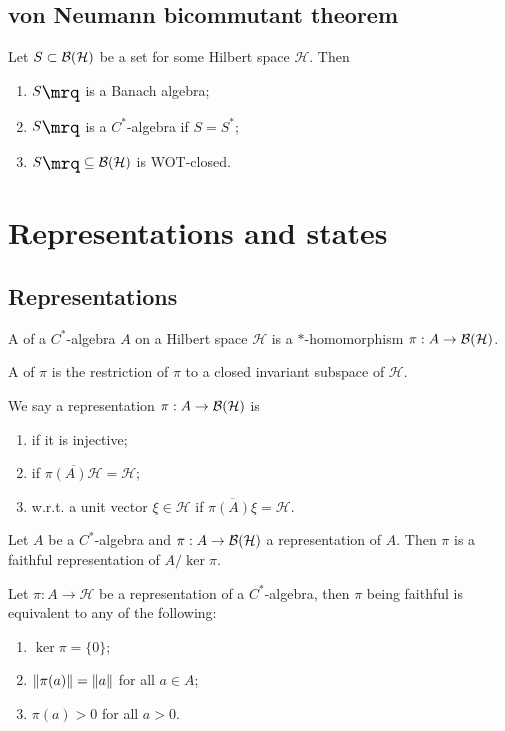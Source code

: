 \section{von Neumann bicommutant theorem}
\begin{proposition} \label{commutantBanachAlgebra}
Let $S\subset \operatorname{\mathcal{B}}(\mathcal{H})$ be a set for some Hilbert space $\mathcal{H}$. Then
\begin{enumerate}
\item $\comm{S}$ is a Banach algebra;
\item $\comm{S}$ is a $C^*$-algebra if $S = S^*$;
\item $\comm{S}\subseteq \Bounded(\mathcal{H})$ is WOT-closed.
\end{enumerate}
\end{proposition}

\chapter{Representations and states}
\section{Representations}
\begin{definition}
A  of a $C^*$-algebra $A$ on a Hilbert space $\mathcal{H}$ is a $*$-homomorphism $\pi: A \to \operatorname{\mathcal{B}}(\mathcal{H})$.

A  of $\pi$ is the restriction of $\pi$ to a closed invariant subspace of $\mathcal{H}$.

We say a representation $\pi: A \to \operatorname{\mathcal{B}}(\mathcal{H})$ is
\begin{enumerate}
\item {} if it is injective;
\item {} if $\overline{\pi(A)\mathcal{H}} = \mathcal{H}$;
\item {} w.r.t. a unit vector $\xi\in\mathcal{H}$ if $\overline{\pi(A)\xi} = \mathcal{H}$.
\end{enumerate}
\end{definition}

\begin{lemma}
Let $A$ be a $C^*$-algebra and $\pi: A \to \operatorname{\mathcal{B}}(\mathcal{H})$ a representation of $A$. Then $\pi$ is a faithful representation of $A/\ker\pi$.
\end{lemma}

\begin{proposition}
Let $\pi:A\to\mathcal{H}$ be a representation of a $C^*$-algebra, then $\pi$ being faithful is equivalent to any of the following:
\begin{enumerate}
\item $\ker \pi = \{0\}$;
\item $\lVert\pi(a)\rVert = \lVert a\rVert$ for all $a\in A$;
\item $\pi(a) > 0$ for all $a>0$.
\end{enumerate}
\end{proposition}

